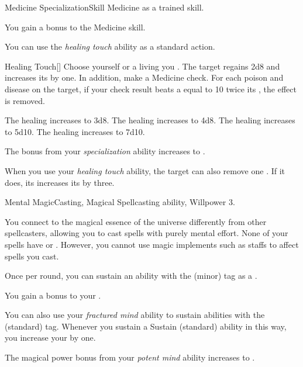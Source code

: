     \begin{feat}{Medicine Specialization}{Skill}
        \featpre Medicine as a trained skill.

         You gain a  bonus to the Medicine skill.

         You can use the \textit{healing touch} ability as a standard action.
        \begin{activeability}{Healing Touch}[]
            \rankline
            Choose yourself or a living  you .
            The target regains 2d8  and increases its  by one.
            In addition, make a Medicine check.
            For each poison and disease on the target, if your check result beats a  equal to 10 \add twice its , the effect is removed.

            \rankline
             The healing increases to 3d8.
             The healing increases to 4d8.
             The healing increases to 5d10.
             The healing increases to 7d10.
        \end{activeability}

         The bonus from your \textit{specialization} ability increases to .

         When you use your \textit{healing touch} ability, the target can also remove one .
        If it does, its increases its  by three.
    \end{feat}

    \begin{magicalfeat}{Mental Magic}{Casting, Magical}
        \featpre Spellcasting ability, Willpower 3.

         You connect to the magical essence of the universe differently from other spellcasters, allowing you to cast spells with purely mental effort.
        None of your spells have  or .
        However, you cannot use magic implements such as staffs to affect spells you cast.

         Once per round, you can sustain an ability with the  (minor) tag as a .

         You gain a  bonus to your .

         You can also use your \textit{fractured mind} ability to sustain abilities with the  (standard) tag.
        Whenever you sustain a Sustain (standard) ability in this way, you increase your  by one.

         The magical power bonus from your \textit{potent mind} ability increases to .
    \end{magicalfeat}

